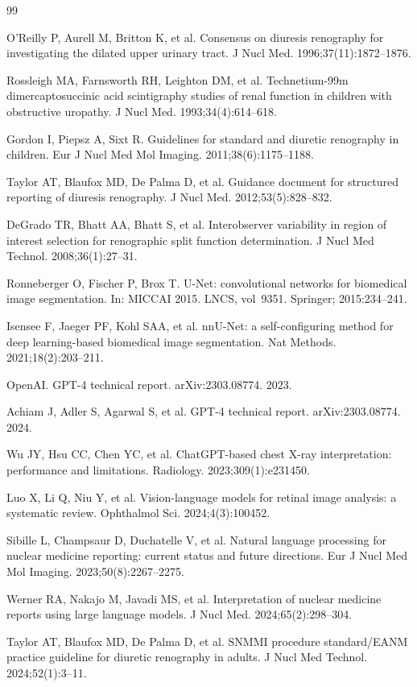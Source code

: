 \documentclass[sn-basic]{sn-jnl}
\begin{document}
\begin{thebibliography}{99}

O'Reilly P, Aurell M, Britton K, et al.
Consensus on diuresis renography for investigating the
dilated upper urinary tract.
J Nucl Med. 1996;37(11):1872--1876.

Rossleigh MA, Farnsworth RH, Leighton DM, et al.
Technetium-99m dimercaptosuccinic acid scintigraphy studies
of renal function in children with obstructive uropathy.
J Nucl Med. 1993;34(4):614--618.

Gordon I, Piepsz A, Sixt R.
Guidelines for standard and diuretic renography in children.
Eur J Nucl Med Mol Imaging. 2011;38(6):1175--1188.

Taylor AT, Blaufox MD, De Palma D, et al.
Guidance document for structured reporting of diuresis
renography.
J Nucl Med. 2012;53(5):828--832.

DeGrado TR, Bhatt AA, Bhatt S, et al.
Interobserver variability in region of interest selection for
renographic split function determination.
J Nucl Med Technol. 2008;36(1):27--31.

Ronneberger O, Fischer P, Brox T.
U-Net: convolutional networks for biomedical image
segmentation.
In: MICCAI 2015. LNCS, vol~9351. Springer; 2015:234--241.

Isensee F, Jaeger PF, Kohl SAA, et al.
nnU-Net: a self-configuring method for deep learning-based
biomedical image segmentation.
Nat Methods. 2021;18(2):203--211.

OpenAI.
GPT-4 technical report.
arXiv:2303.08774. 2023.

Achiam J, Adler S, Agarwal S, et al.
GPT-4 technical report.
arXiv:2303.08774. 2024.

Wu JY, Hsu CC, Chen YC, et al.
ChatGPT-based chest X-ray interpretation: performance and
limitations.
Radiology. 2023;309(1):e231450.

Luo X, Li Q, Niu Y, et al.
Vision-language models for retinal image analysis: a
systematic review.
Ophthalmol Sci. 2024;4(3):100452.

Sibille L, Champsaur D, Duchatelle V, et al.
Natural language processing for nuclear medicine reporting:
current status and future directions.
Eur J Nucl Med Mol Imaging. 2023;50(8):2267--2275.

Werner RA, Nakajo M, Javadi MS, et al.
Interpretation of nuclear medicine reports using large
language models.
J Nucl Med. 2024;65(2):298--304.

Taylor AT, Blaufox MD, De Palma D, et al.
SNMMI procedure standard/EANM practice guideline for
diuretic renography in adults.
J Nucl Med Technol. 2024;52(1):3--11.

\end{thebibliography}
\end{document}
